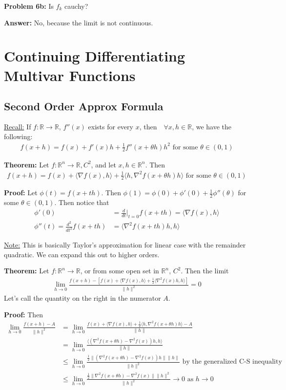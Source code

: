 \documentclass{article}
\newcommand*{\txt}[1]{\text{ #1 }}%
\newcommand*{\iprod}[1]{\langle #1 \rangle}
\newcommand*{\fora}{\txt{}\forall}%
\newcommand*{\rr}{\mathbb{R}}%
\begin{document}
\textbf{Problem 6b:} Is $f_k$ cauchy? 

\textbf{Answer:} No, because the limit is not continuous.

\section{Continuing Differentiating Multivar Functions}

\subsection{Second Order Approx Formula}

\underline{Recall:} If $f:\rr\to\rr$, $f''(x)$ exists for every $x$, then $\fora x,h\in \rr$, we have the following: \begin{align*}
    f(x+h)=f(x)+f'(x)h+\frac{1}{2}f''(x+\theta h)h^2\txt{for some}\theta\in (0,1)
\end{align*}

\textbf{Theorem:} Let $f:\rr^n\to \rr, C^2$, and let $x,h\in \rr^n$. Then \begin{align*}
    f(x+h)=f(x)+\iprod{\nabla f(x),h}+\frac{1}{2}\iprod{h,\nabla^2 f(x+\theta h)h}\txt{for some}\theta\in (0,1)
\end{align*}

\textbf{Proof:} Let $\phi(t)=f(x+th)$. Then $\phi(1)=\phi(0)+\phi'(0)+\frac{1}{2}\phi''(\theta)$ for some $\theta\in (0,1)$. Then notice that \begin{align*}
    \phi'(0)&=\frac{d}{dt}|_{t=0}f(x+th)=\iprod{\nabla f(x),h}\\
    \phi''(t)=\frac{d^2}{dt^2}f(x+th)&=\iprod{\nabla^2 f(x+th)h,h}
\end{align*}

\underline{Note:} This is basically Taylor's approximation for linear case with the remainder quadratic. We can expand this out to higher orders.

\textbf{Theorem:} Let $f:\rr^n\to \rr$, or from some open set in $\rr^n$, $C^2$. Then the limit \begin{align*}
    \lim_{h\to 0}\frac{f(x+h)-[f(x)+\iprod{\nabla f(x),h}+\frac{1}{2}\iprod{\nabla^2f(x)h,h}]}{\|h\|^2}=0
\end{align*} Let's call the quantity on the right in the numerator $A$. 

\textbf{Proof:} Then \begin{align*}
    \lim_{h\to 0}\frac{f(x+h)-A}{\|h\|^2}&=\lim_{h\to 0}\frac{f(x)+\iprod{\nabla f(x),h}+\frac{1}{2}\iprod{h,\nabla^2 f(x+\theta h)h}-A}{\|h\|}\\
    &=\lim_{h\to 0}\frac{\iprod{(\nabla^2f(x+\theta h)-\nabla^2f(x))h,h}}{\|h\|}\\
    &\leq \lim_{h\to 0}\frac{\frac{1}{2}\|(\nabla^2f(x+\theta h)-\nabla^2f(x))h\|\|h\|}{\|h\|^2}\txt{by the generalized C-S inequality}\\
    &\leq \lim_{h\to 0}\frac{\frac{1}{2}\|\nabla^2f(x+\theta h)-\nabla^2f(x)\|\|h\|^2}{\|h\|^2}\to 0\txt{as}h\to 0
\end{align*}
\end{document}
